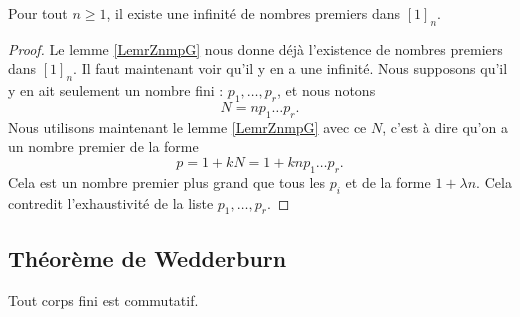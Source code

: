 \begin{theorem}    \label{ThoxwTjcl}   
    Pour tout \( n\geq 1\), il existe une infinité de nombres premiers dans \( [1]_n\).
\end{theorem}

\begin{proof}
    Le lemme \ref{LemrZnmpG} nous donne déjà l'existence de nombres premiers dans \( [1]_n\). Il faut maintenant voir qu'il y en a une infinité. Nous supposons qu'il y en ait seulement un nombre fini : \( p_1,\ldots, p_r\), et nous notons 
    \begin{equation}
        N=np_1\ldots p_r.
    \end{equation}
    Nous utilisons maintenant le lemme \ref{LemrZnmpG} avec ce \( N\), c'est à dire qu'on a un nombre premier de la forme
    \begin{equation}
        p=1+kN=1+knp_1\ldots p_r.
    \end{equation}
    Cela est un nombre premier plus grand que tous les \( p_i\) et de la forme \( 1+\lambda n\). Cela contredit l'exhaustivité de la liste \( p_1,\ldots, p_r\).
\end{proof}

\subsection{Théorème de Wedderburn}

\begin{theorem}    \label{ThoMncIWA}
    Tout corps fini est commutatif.
\end{theorem}


